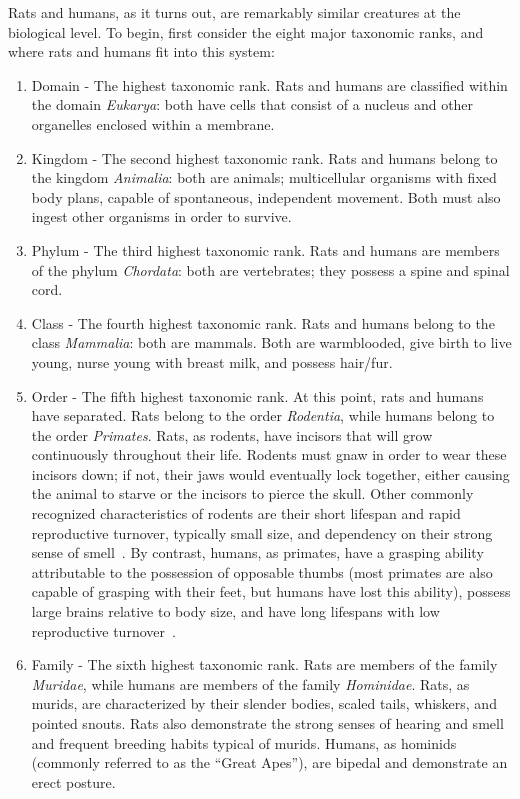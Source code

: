 \documentclass[12pt]{article}
\begin{document}
Rats and humans, as it turns out, are remarkably similar creatures at the biological level. To begin, first consider the eight major taxonomic ranks, and where rats and humans fit into this system:
\begin{enumerate}
\item Domain - The highest taxonomic rank. Rats and humans are classified within the domain \textit{Eukarya}: both have cells that consist of a nucleus and other organelles enclosed within a membrane.
\item Kingdom - The second highest taxonomic rank. Rats and humans belong to the kingdom \textit{Animalia}: both are animals; multicellular organisms with fixed body plans, capable of spontaneous, independent movement. Both must also ingest other organisms in order to survive.
\item Phylum - The third highest taxonomic rank. Rats and humans are members of the phylum \textit{Chordata}: both are vertebrates; they possess a spine and spinal cord.
\item Class - The fourth highest taxonomic rank. Rats and humans belong to the class \textit{Mammalia}: both are mammals. Both are warmblooded, give birth to live young, nurse young with breast milk, and possess hair/fur.
\item Order - The fifth highest taxonomic rank. At this point, rats and humans have separated. Rats belong to the order \textit{Rodentia}, while humans belong to the order \textit{Primates}. Rats, as rodents, have incisors that will grow continuously throughout their life. Rodents must gnaw in order to wear these incisors down; if not, their jaws would eventually lock together, either causing the animal to starve or the incisors to pierce the skull. Other commonly recognized characteristics of rodents are their short lifespan and rapid reproductive turnover, typically small size, and dependency on their strong sense of smell~\cite{WalkerRattus1999}. By contrast, humans, as primates, have a grasping ability attributable to the possession of opposable thumbs (most primates are also capable of grasping with their feet, but humans have lost this ability), possess large brains relative to body size, and have long lifespans with low reproductive turnover~\cite{Meek}.
\item Family - The sixth highest taxonomic rank. Rats are members of the family \textit{Muridae}, while humans are members of the family \textit{Hominidae}. Rats, as murids, are characterized by their slender bodies, scaled tails, whiskers, and pointed snouts. Rats also demonstrate the strong senses of hearing and smell and frequent breeding habits typical of murids. Humans, as hominids (commonly referred to as the ``Great Apes''), are bipedal and demonstrate an erect posture.

\end{enumerate}
\end{document}
